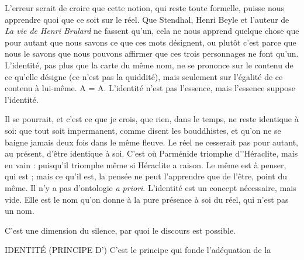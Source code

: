L'erreur serait de croire que cette notion, qui reste toute formelle, puisse
nous apprendre quoi que ce soit sur le réel. Que Stendhal, Henri Beyle et
l’auteur de {\it La vie de Henri Brulard} ne fassent qu’un, cela ne nous apprend
quelque chose que pour autant que nous savons ce que ces mots désignent, ou
plutôt c’est parce que nous le savons que nous pouvons affirmer que ces trois
personnages ne font qu’un. L'identité, pas plus que la carte du même nom, ne
se prononce sur le contenu de ce qu’elle désigne (ce n’est pas la quiddité), mais
seulement sur l'égalité de ce contenu à lui-même. A = A. L'identité n’est pas
l'essence, mais l'essence suppose l'identité.

Il se pourrait, et c’est ce que je crois, que rien, dans le temps, ne reste identique
à soi: que tout soit impermanent, comme disent les bouddhistes, et
qu'on ne se baigne jamais deux fois dans le même fleuve. Le réel ne cesserait pas
pour autant, au présent, d’être identique à soi. C’est où Parménide triomphe
d’'Héraclite, mais en vain : puisqu'il triomphe même si Héraclite a raison. Le
même est à penser, qui est ; mais ce qu'il est, la pensée ne peut l’apprendre que
de l'être, point du même. Il n’y a pas d’ontologie {\it a priori}. L'identité est un
concept nécessaire, mais vide. Elle est le nom qu’on donne à la pure présence à
soi du réel, qui n’est pas un nom.

C’est une dimension du silence, par quoi le discours est possible.

IDENTITÉ (PRINCIPE D’) C’est le principe qui fonde l'adéquation de la

